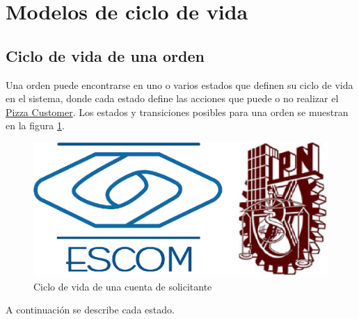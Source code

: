 
\section{Modelos de ciclo de vida}

	\hypertarget{CV:CuentaSolicitante}{}
	\subsection{Ciclo de vida de una orden}

		Una orden puede encontrarse en uno o varios estados que definen su ciclo de vida en el sistema, donde cada estado define las acciones que puede o no realizar el \hyperlink{A:Pizza Customer}{Pizza Customer}. Los estados y transiciones posibles para una orden se muestran en la figura \ref{fig:CV:CuentaSolcitante}.

		\begin{figure}[h]
			
			\begin{center}				
				
				\includegraphics[scale=0.35]{imagenes/CiclosDeVida/cv-CuentaSolicitante.jpg}
				\caption{Ciclo de vida de una cuenta de solicitante}
				\label{fig:CV:CuentaSolcitante}
				
			\end{center}
			
		\end{figure}
	
		A continuación se describe cada estado.

